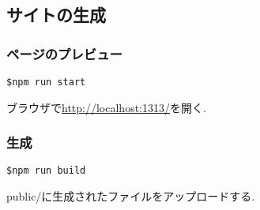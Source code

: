 \subsection{サイトの生成}
\subsubsection{ページのプレビュー}
\begin{lstlisting}[]
  $npm run start
\end{lstlisting}

ブラウザで\url{http://localhost:1313/}を開く.

\subsubsection{生成}
\begin{lstlisting}[]
  $npm run build
\end{lstlisting}

public/に生成されたファイルをアップロードする.